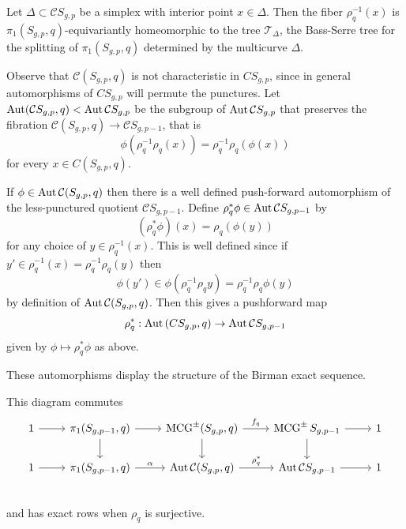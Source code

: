 \begin{theorem}
  Let $\Delta \subset \mathcal C S_{g,p}$
  be a simplex with interior point $x \in \Delta$.
  Then the fiber $\rho^{-1}_q(x)$ is
  $\pi_1 \left ( S_{g,p}, q \right )$-equivariantly
  homeomorphic to the tree $\mathcal T_\Delta$,
  the Bass-Serre tree for the splitting of
  $\pi_1 \left ( S_{g,p}, q \right )$
  determined by the multicurve $\Delta$.
  \label{thm:kent}
\end{theorem}

\begin{remark}
Observe that $\mathcal C(S_{g,p},q)$
is not characteristic in $C S_{g,p}$,
since in general automorphisms of $C S_{g,p}$ will permute the punctures.
Let $\operatorname{Aut} (\mathcal C S_{g,p},q) < \operatorname{Aut} \mathcal C S_{g,p}$
be the subgroup of $\operatorname{Aut} \mathcal C S_{g,p}$
that preserves the fibration
$\mathcal C(S_{g,p},q) \to \mathcal C S_{g,p-1}$, that is
$$\phi \left ( \rho_q^{-1}\rho_q(x) \right ) = \rho_q^{-1}\rho_q(\phi(x))$$
for every $x \in C(S_{g,p},q)$.

If $\phi \in \operatorname{Aut} \mathcal C(S_{g,p},q)$ then there is a well defined push-forward
automorphism of the less-punctured quotient $\mathcal CS_{g,p-1}$.
Define $\rho^\ast_q \phi \in \operatorname{Aut} \mathcal CS_{g,p-1}$
by
$$\left (  \rho^\ast_q \phi \right ) (x) = \rho_q \left(\phi (y) \right )$$
for any choice of $y \in \rho^{-1}_q(x)$. This is well defined since if $y' \in \rho^{-1}_q(x) =\rho^{-1}_q\rho_q(y)$
then
$$\phi(y') \in \phi(\rho^{-1}_q \rho_q y ) = \rho^{-1}_q \rho_q\phi( y )$$
by definition of $\operatorname{Aut} \mathcal C(S_{g,p},q)$.
Then this gives a pushforward map
$$
\rho_q^\ast : \operatorname{Aut} \mathcal (CS_{g,p},q) \to  \operatorname{Aut} \mathcal CS_{g,p-1}
$$
given by $\phi \mapsto \rho_q^\ast \phi$ as above.
\end{remark}

These automorphisms display the structure of the Birman exact sequence.

\begin{lemma}
  This diagram commutes
  $$
  \begin{tikzcd}
  1 \arrow[r]&
  \pi_1(S_{g,p-1},q) \arrow[r] \arrow[d]&
  \mcg^{\pm}(S_{g,p},q)  \arrow{r}{f_q} \arrow[d]&
  \mcg^{\pm}S_{g,p-1} \arrow[r] \arrow[d]&
  1 \\
  1 \arrow[r]&
  \pi_1(S_{g,p-1},q) \arrow{r}{\alpha}&
  \aaut \mathcal C (S_{g,p},q)  \arrow{r}{\rho^\ast_{q}}&
  \aaut \mathcal C S_{g,p-1} \arrow{r}&
  1 \\
  \end{tikzcd}
  $$
  and has exact rows when $\rho_{q}$ is surjective.
  \label{lemma:exact}
\end{lemma}



